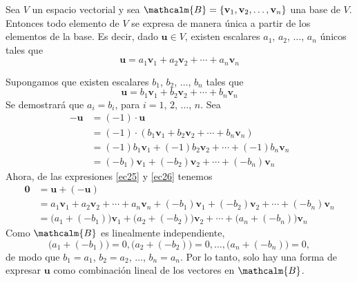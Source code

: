 \begin{theorem}{}{}
    Sea $V$ un espacio vectorial y sea $\mathcalm{B} = \{ \mathbf{v}_1, \mathbf{v}_2, \dots, \mathbf{v}_n \}$ una base de $V$. Entonces todo elemento de $V$ se expresa de manera única a partir de los elementos de la base. Es decir, dado $\mathbf{u} \in V$, existen escalares $a_1$, $a_2$, $\dots$, $a_n$ únicos tales que
    \begin{equation}
        \mathbf{u} = a_1\mathbf{v}_1 + a_2\mathbf{v}_2 + \cdots + a_n\mathbf{v}_n \label{ec25}
    \end{equation}

    \tcblower
    \demostracion Supongamos que existen escalares $b_1$, $b_2$, $\dots$, $b_n$ tales que
    \begin{equation}
        \mathbf{u} = b_1\mathbf{v}_1 + b_2\mathbf{v}_2 + \cdots + b_n\mathbf{v}_n \label{ec26}
    \end{equation}
    Se demostrará que $a_i = b_i$, para $i = 1$, $2$, $\dots$, $n$. Sea
    \begin{align*}
        -\mathbf{u} & = (-1) \cdot \mathbf{u} \\
        & = (-1) \cdot (b_1\mathbf{v}_1 + b_2\mathbf{v}_2 + \cdots + b_n\mathbf{v}_n) \\
        & = (-1)b_1\mathbf{v}_1 + (-1)b_2\mathbf{v}_2 + \cdots + (-1)b_n\mathbf{v}_n \\
        & = (-b_1)\mathbf{v}_1 + (-b_2)\mathbf{v}_2 + \cdots + (-b_n)\mathbf{v}_n
    \end{align*}
    Ahora, de las expresiones \eqref{ec25} y \eqref{ec26} tenemos
    \begin{align*}
        \mathbf{0} & = \mathbf{u} + (-\mathbf{u}) \\
        & = a_1\mathbf{v}_1 + a_2\mathbf{v}_2 + \cdots + a_n\mathbf{v}_n + (-b_1)\mathbf{v}_1 + (-b_2)\mathbf{v}_2 + \cdots + (-b_n)\mathbf{v}_n \\
        & = \big(a_1+(-b_1)\big)\mathbf{v}_1 + \big(a_2+(-b_2)\big)\mathbf{v}_2 + \cdots + \big(a_n+(-b_n)\big)\mathbf{v}_n
    \end{align*}
    Como $\mathcalm{B}$ es linealmente independiente,
    $$\big(a_1+(-b_1)\big) = 0, \big(a_2+(-b_2)\big) = 0, \dots, \big(a_n+(-b_n)\big) = 0,$$
    de modo que $b_1 = a_1$, $b_2 = a_2$, $\dots$, $b_n = a_n$. Por lo tanto, solo hay una forma de expresar $\mathbf{u}$ como combinación lineal de los vectores en $\mathcalm{B}$.
\end{theorem}

\newpage

